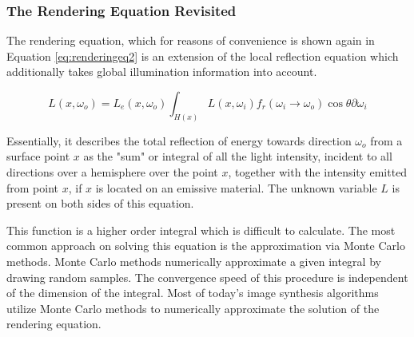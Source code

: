 \subsubsection{The Rendering Equation Revisited}

The rendering equation, which for reasons of convenience is shown again in Equation \ref{eq:renderingeq2} is an extension of the local reflection equation which additionally takes global illumination information into account. 

\begin{equation}\label{eq:renderingeq2}
L(x, \omega_{o}) = L_{e}(x, \omega_{o}) \int_{H(x)} L(x, \omega_{i})f_{r}(\omega_{i} \rightarrow \omega_{o})\cos\theta\partial\omega_{i}
\end{equation}

Essentially, it describes the total reflection of energy towards direction $\omega_{o}$ from a surface point $x$ as the "sum" or integral of all the light intensity, incident to all directions over a hemisphere over the point $x$, together with the intensity emitted from point $x$, if $x$ is located on an emissive material. The unknown variable $L$ is present on both sides of this equation.

This function is a higher order integral which is difficult to calculate. The most common approach on solving this equation is the approximation via Monte Carlo methods. Monte Carlo methods numerically approximate a given integral by drawing random samples. The convergence speed of this procedure is independent of the dimension of the integral. Most of today's image synthesis algorithms utilize Monte Carlo methods to numerically approximate the solution of the rendering equation.


